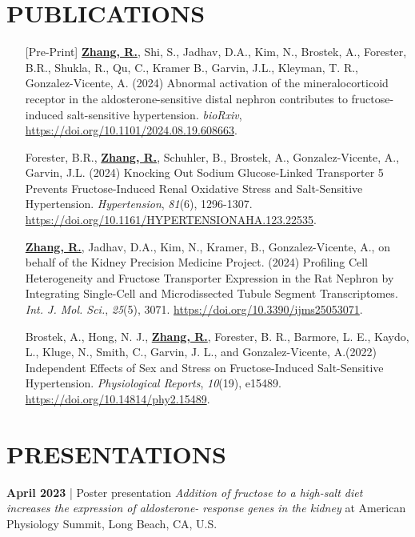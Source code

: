 \documentclass[letterpaper,11pt]{article}
\begin{document}
	\section{PUBLICATIONS}
	\begin{itemize}[itemsep=-2pt, parsep=5pt, leftmargin=0pt]
		\item[] [Pre-Print] \underline{\textbf{Zhang, R.}}, Shi, S., Jadhav, D.A., Kim, N., Brostek, A., Forester, B.R., Shukla, R., Qu, C., Kramer B., Garvin, J.L., Kleyman, T. R., Gonzalez-Vicente, A. (2024) Abnormal activation of the mineralocorticoid receptor in the aldosterone-sensitive distal nephron contributes to fructose-induced salt-sensitive hypertension. \textit{bioRxiv}, \url{https://doi.org/10.1101/2024.08.19.608663}.
		\item[] Forester, B.R., \underline{\textbf{Zhang, R.}}, Schuhler, B., Brostek, A., Gonzalez-Vicente, A., Garvin, J.L. (2024) Knocking Out Sodium Glucose-Linked Transporter 5 Prevents Fructose-Induced Renal Oxidative Stress and Salt-Sensitive Hypertension. \textit{Hypertension}, \textit{81}(6), 1296-1307. \url{https://doi.org/10.1161/HYPERTENSIONAHA.123.22535}.
		\item[] \underline{\textbf{Zhang, R.}}, Jadhav, D.A., Kim, N., Kramer, B., Gonzalez-Vicente, A., on behalf of the Kidney Precision Medicine Project. (2024) Profiling Cell Heterogeneity and Fructose Transporter Expression in the Rat Nephron by Integrating Single-Cell and Microdissected Tubule Segment Transcriptomes. \textit{Int. J. Mol. Sci.}, \textit{25}(5), 3071. \url{https://doi.org/10.3390/ijms25053071}.
		\item[] Brostek, A., Hong, N. J., \underline{\textbf{Zhang, R.}}, Forester, B. R., Barmore, L. E., Kaydo, L., Kluge, N., Smith, C., Garvin, J. L., and Gonzalez-Vicente, A.(2022) Independent Effects of Sex and Stress on Fructose-Induced Salt-Sensitive Hypertension. \textit{Physiological Reports}, \textit{10}(19), e15489. \url{https://doi.org/10.14814/phy2.15489}. 
	\end{itemize}
	\section{PRESENTATIONS}
	\vspace{0pt}
	\textbf{April 2023} | Poster presentation {\textit{Addition of fructose to a high-salt diet increases the expression of aldosterone- response genes in the kidney}}  at American Physiology Summit, Long Beach, CA, U.S.
\end{document}
